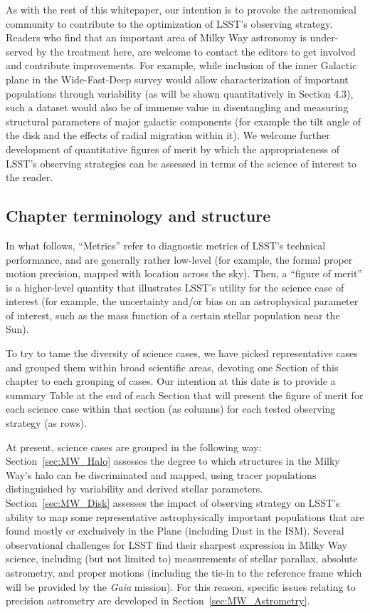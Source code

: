 As with the rest of this whitepaper, our intention is to provoke the
astronomical community to contribute to the optimization of LSST's
observing strategy. Readers who find that an important area of Milky
Way astronomy is under-served by the treatment here, are welcome to
contact the editors to get involved and contribute improvements. For
example, while inclusion of the inner Galactic plane in the
Wide-Fast-Deep survey would allow characterization of important
populations through variability (as will be shown quantitatively in
Section 4.3), such a dataset would also be of immense value in
disentangling and measuring structural parameters of major galactic
components (for example the tilt angle of the disk and the effects of
radial migration within it). We welcome further development of
quantitative figures of merit by which the appropriateness of LSST's observing
strategies can be assessed in terms of the science of interest to the
reader.

\subsection{Chapter terminology and structure}

In what follows, ``Metrics'' refer to diagnostic metrics of LSST's
technical performance, and are generally rather low-level (for
example, the formal proper motion precision, mapped with location
across the sky). Then, a ``figure of merit'' is a higher-level
quantity that illustrates LSST's utility for the science case of
interest (for example, the uncertainty and/or bias on an astrophysical
parameter of interest, such as the mass function of a certain stellar
population near the Sun).

To try to tame the diversity of science cases, we have picked
representative cases and grouped them within broad scientific areas,
devoting one Section of this chapter to each grouping of cases. Our
intention at this date is to provide a summary Table at the end of
each Section that will present the figure of merit for each science
case within that section (as columns) for each tested observing
strategy (as rows).

At present, science cases are grouped in the following way:
Section~\ref{sec:MW_Halo} assesses the degree to which structures in the Milky
Way's halo can be discriminated and mapped, using tracer populations
distinguished by variability and derived stellar parameters.
Section~\ref{sec:MW_Disk} assesses the impact of observing strategy on LSST's
ability to map some representative astrophysically important
populations that are found mostly or exclusively in the Plane
(including Dust in the ISM). Several observational challenges for LSST
find their sharpest expression in Milky Way science, including (but
not limited to) measurements of stellar parallax, absolute astrometry,
and proper motions (including the tie-in to the reference frame which
will be provided by the \textit{Gaia} mission). For this reason, specific
issues relating to precision astrometry are developed in
Section~\ref{sec:MW_Astrometry}.

